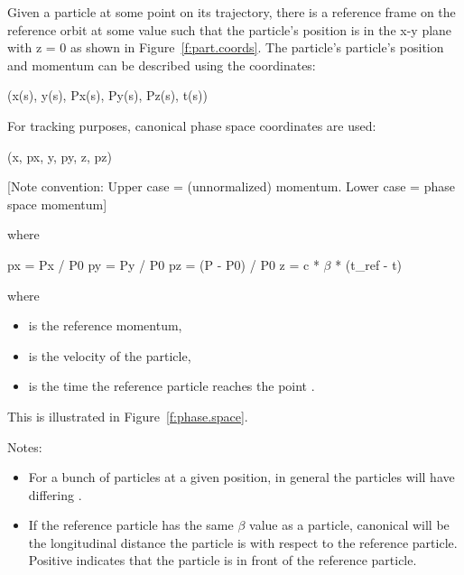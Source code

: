 \documentclass{hitec}
\begin{document}
Given a particle at some point on its trajectory, there is a reference frame on the reference orbit
at some  value such that the particle's position is in the x-y plane with z = 0 as shown
in Figure~\ref{f:part.coords}. The
particle's particle's position and momentum  can be described using the coordinates:
{\small
\begin{code}
    (x(s), y(s), Px(s), Py(s), Pz(s), t(s))
\end{code}}

For tracking purposes, canonical phase space coordinates are used:
{\small
\begin{code}
    (x, px, y, py, z, pz)   
\end{code}}
[Note convention: Upper case  = (unnormalized) momentum. Lower case  = phase space momentum]

where
{\small
\begin{code}
    px = Px / P0
    py = Py / P0
    pz = (P - P0) / P0
    z  = c * $\beta$ * (t_ref - t)
\end{code}}

where 
\begin{itemize}
\item {} is the reference momentum, 
\item \vn{$\beta$} is the velocity of the particle, 
\item {} is the time the reference particle reaches the point .
\end{itemize}

This is illustrated in Figure~\ref{f:phase.space}.

Notes:
\begin{itemize}
\item For a bunch of particles at a given  position, in general the particles will have differing .
\item If the reference particle has the same $\beta$ value as a particle, canonical  will be the longitudinal distance 
the particle is with respect to the reference particle. Positive  indicates that the particle
is in front of the reference particle.
\end{itemize}
\end{document}
